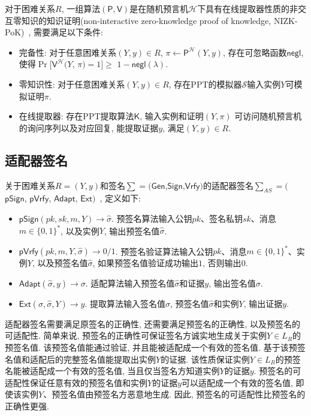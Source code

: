 \documentclass[review]{jcr}
\begin{document}
对于困难关系$R$, 一组算法$(\mathsf{P},\mathsf{V})$是在随机预言机$\mathcal{H}$下具有在线提取器性质的非交互零知识的知识证明(non-interactive zero-knowledge proof of knowledge, NIZK-PoK)~\cite{AumayrEEFHMMR20,Fischlin05}, 需要满足以下条件: 

\begin{itemize}
  \item 完备性: 对于任意困难关系$(Y,y)\in R$, $\pi\leftarrow \mathsf{P}^{\mathcal{H}}(Y,y)$, 存在可忽略函数$\mathsf{negl}$, 使得$\Pr[$$\mathsf{V}^{\mathcal{H}}$$(Y$, $\pi)$$=1]$$\geq$ $1-\mathsf{negl}(\lambda)$. 
  \item 零知识性: 对于任意困难关系$(Y,y)\in R$, 存在PPT的模拟器$\mathcal{S}$输入实例$Y$可模拟证明$\pi$.
  \item 在线提取器: 存在PPT提取算法$\mathsf{K}$, 输入实例和证明$(Y,\pi)$ 可访问随机预言机的询问序列以及对应回复, 能提取证据$y$, 满足$(Y,y)\in R$.  
\end{itemize}

\subsection{适配器签名}
关于困难关系$R=(Y,y)$和签名$\sum=(\mathsf{Gen}$,$\mathsf{Sign}$,$\mathsf{Vrfy})$的适配器签名$\sum_{AS}=($$\mathsf{pSign}$, $\mathsf{pVrfy}$, $\mathsf{Adapt}$, $\mathsf{Ext})$~\cite{AumayrEEFHMMR20}, 定义如下: 

\begin{itemize}
  \item $\mathsf{pSign}(pk,sk,m,Y)\rightarrow \hat{\sigma}$. 预签名算法输入公钥$pk$、签名私钥$sk$、消息$m\in\{0,1\}^*$, 以及实例$Y$, 输出预签名值$\hat{\sigma}$.

  \item $\mathsf{pVrfy}(pk,m,Y,\hat{\sigma})\rightarrow 0/1$. 预签名验证算法输入公钥$pk$、消息$m\in\{0,1\}^*$、实例$Y$, 以及预签名值$\hat{\sigma}$, 如果预签名值验证成功输出$1$, 否则输出$0$.

  \item $\mathsf{Adapt}(\hat{\sigma},y)\rightarrow \sigma$.
  适配算法输入预签名值$\hat{\sigma}$和证据$y$, 输出签名值$\sigma$.

  \item $\mathsf{Ext}(\sigma,\hat{\sigma},Y)\rightarrow y$.
  提取算法输入签名值$\sigma$, 预签名值$\hat{\sigma}$和实例$Y$, 输出证据$y$.
\end{itemize}

适配器签名需要满足原签名的正确性, 还需要满足预签名的正确性, 以及预签名的可适配性. 简单来说, 预签名的正确性可保证签名方诚实地生成关于实例$Y\in L_R$的预签名值. 该预签名值能通过验证, 并且能被适配成一个有效的签名值. 基于该预签名值和适配后的完整签名值能提取出实例$Y$的证据. 该性质保证实例$Y\in L_R$的预签名能被适配成一个有效的签名值, 当且仅当签名方知道实例$Y$的证据$y$. 预签名的可适配性保证任意有效的预签名值和实例$Y$的证据$y$可以适配成一个有效的签名值, 即使该实例$Y$、预签名值由预签名方恶意地生成. 因此, 预签名的可适配性比预签名的正确性更强. 
\end{document}
